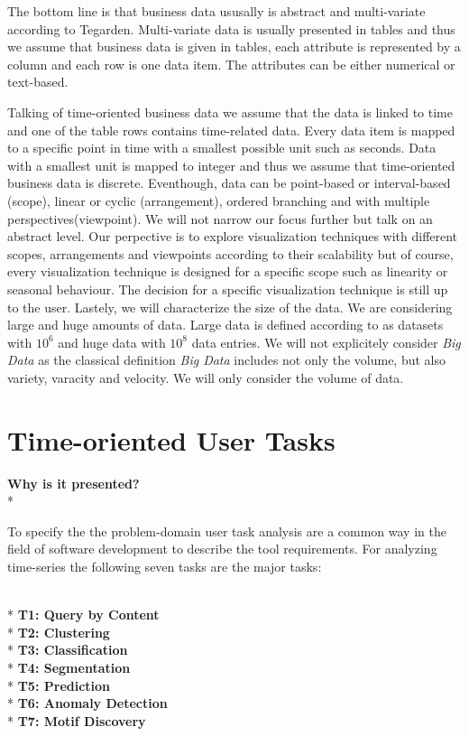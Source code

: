 The bottom line is that business data ususally is abstract and multi-variate according to Tegarden\cite{tegarden1999}. Multi-variate data is usually presented in tables\cite{Borgo2013} and thus we assume that business data is given in tables, each attribute is represented by a column and each row is one data item. The attributes can be either numerical or text-based. 


Talking of time-oriented business data we assume that the data is linked to time and one of the table rows contains time-related data. Every data item is mapped to a specific point in time with a smallest possible unit such as seconds. Data with a smallest unit is mapped to integer\cite{Aigner2011} and thus we assume that time-oriented business data is discrete. Eventhough, data can be point-based or interval-based (scope), linear or cyclic (arrangement), ordered branching and with multiple perspectives(viewpoint)\cite{Aigner2011}. We will not narrow our focus further but talk on an abstract level. Our perpective is to explore visualization techniques with different scopes, arrangements and viewpoints according to their scalability but of course, every visualization technique is designed for a specific scope such as linearity or seasonal behaviour. The decision for a specific visualization technique is still up to the user. 
Lastely, we will characterize the size of the data. We are considering large and huge amounts of data. Large data is defined according to\cite{Huber1994} as datasets with $10^6$ and huge data with $10^8$ data entries. We will not explicitely consider \textit{Big Data} as the classical definition \textit{Big Data} includes not only the volume, but also variety, varacity and velocity. We will only consider the volume of data.


\section{Time-oriented User Tasks}
\textbf{Why is it presented?}\\*

To specify the the problem-domain user task analysis are a common way in the field of software development to describe the tool requirements\cite{Aigner2011}.
For analyzing time-series the following seven tasks are the major tasks\cite{Esling2012}:

\\*
\textbf{T1: Query by Content}
\\*
\textbf{T2: Clustering}
\\*
\textbf{T3: Classification}
\\*
\textbf{T4: Segmentation}
\\*
\textbf{T5: Prediction}
\\*
\textbf{T6: Anomaly Detection}
\\*
\textbf{T7: Motif Discovery}

